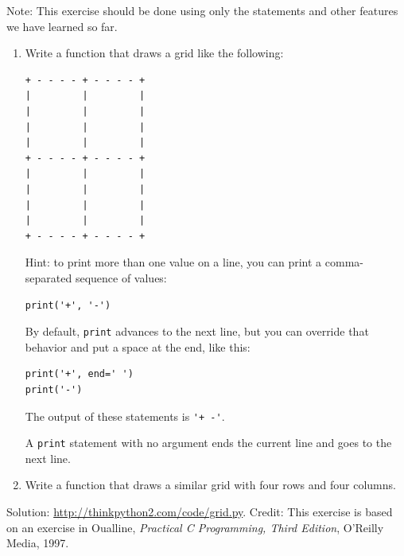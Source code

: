 \begin{exercise}

Note: This exercise should be
done using only the statements and other features we have learned so
far.

\begin{enumerate}

\item Write a function that draws a grid like the following:

\begin{lstlisting}
+ - - - - + - - - - +
|         |         |
|         |         |
|         |         |
|         |         |
+ - - - - + - - - - +
|         |         |
|         |         |
|         |         |
|         |         |
+ - - - - + - - - - +
\end{lstlisting}
%
Hint: to print more than one value on a line, you can print
a comma-separated sequence of values:

\begin{lstlisting}
print('+', '-')
\end{lstlisting}
%
By default, {\tt print} advances to the next line, but you
can override that behavior and put a space at the end, like this:

\begin{lstlisting}
print('+', end=' ')
print('-')
\end{lstlisting}
%
The output of these statements is \verb"'+ -'".

A {\tt print} statement with no argument ends the current line and
goes to the next line.

\item Write a function that draws a similar grid
with four rows and four columns.

\end{enumerate}

Solution: \url{http://thinkpython2.com/code/grid.py}.
Credit: This exercise is based on an exercise in Oualline, {\em
    Practical C Programming, Third Edition}, O'Reilly Media, 1997.

\end{exercise}

